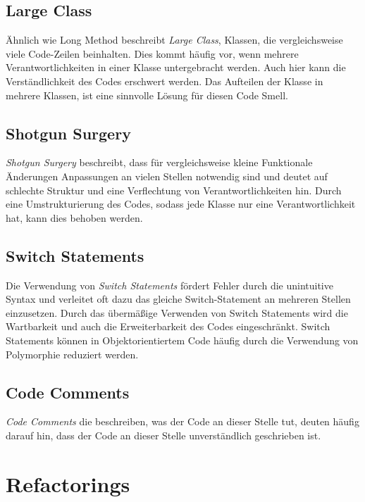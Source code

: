 \documentclass[12pt]{article}
\begin{document}
\subsection{Large Class}

Ähnlich wie Long Method beschreibt \textit{Large Class}, Klassen, die vergleichsweise viele Code-Zeilen beinhalten.
Dies kommt häufig vor, wenn mehrere Verantwortlichkeiten in einer Klasse untergebracht werden. Auch hier kann die Verständlichkeit des Codes erschwert werden.
Das Aufteilen der Klasse in mehrere Klassen, ist eine sinnvolle Lösung für diesen Code Smell.

\subsection{Shotgun Surgery}

\textit{Shotgun Surgery} beschreibt, dass für vergleichsweise kleine Funktionale Änderungen Anpassungen an vielen Stellen notwendig sind und deutet auf schlechte Struktur und eine Verflechtung von Verantwortlichkeiten hin.
Durch eine Umstrukturierung des Codes, sodass jede Klasse nur eine Verantwortlichkeit hat, kann dies behoben werden.

\subsection{Switch Statements}

Die Verwendung von \textit{Switch Statements} fördert Fehler durch die unintuitive Syntax und verleitet oft dazu das gleiche Switch-Statement an mehreren Stellen einzusetzen.
Durch das übermäßige Verwenden von Switch Statements wird die Wartbarkeit und auch die Erweiterbarkeit des Codes eingeschränkt.
Switch Statements können in Objektorientiertem Code häufig durch die Verwendung von Polymorphie reduziert werden.

\subsection{Code Comments}

\textit{Code Comments} die beschreiben, was der Code an dieser Stelle tut, deuten häufig darauf hin, dass der Code an dieser Stelle unverständlich geschrieben ist.

\newpage

\section{Refactorings}
\label{sec:Refactorings}
\end{document}
